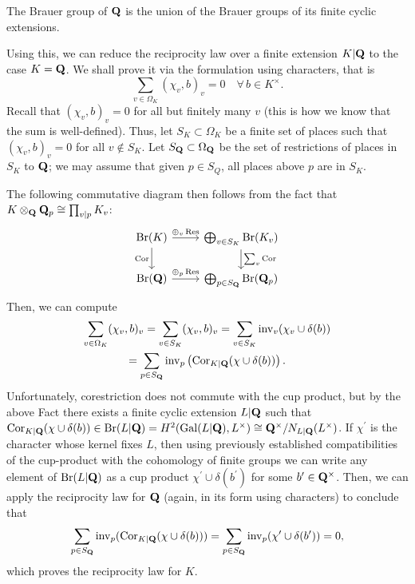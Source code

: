 \documentclass{article}
\begin{document}
\begin{fact}
		The Brauer group of $\mathbf{Q}$ is the union of the Brauer groups of its finite cyclic extensions.
\end{fact}

Using this, we can reduce the reciprocity law over a finite extension $K|\mathbf{Q}$ to the case $K=\mathbf{Q}$. We shall prove it via the formulation using characters, that is
\[
	\sum_{v\in \Omega_K} (\chi_v, b)_v = 0 \quad \forall\, b\in K^\times.
\]
Recall that $(\chi_v, b)_v=0$ for all but finitely many $v$ (this is how we know that the sum is well-defined). Thus, let $S_K\subset \Omega_K$ be a finite set of places such that $(\chi_v, b)_v=0$ for all $v\notin S_K$. Let $S_{\mathbf{Q}}\subset \Omega_{\mathbf{Q}}$ be the set of restrictions of places in $S_K$ to $\mathbf{Q}$; we may assume that given $p\in S_Q$, all places above $p$ are in $S_K$.


The following commutative diagram then follows from the fact that $K\otimes_{\mathbf{Q}} \mathbf{Q}_p \cong \prod_{v|p} K_v$:
\[
	\begin{tikzcd}
			\Br(K) \arrow[r, "\oplus_{v} \operatorname{Res}"] \arrow[d, "\operatorname{Cor}"'] & \bigoplus_{v\in S_K} \Br(K_v) \arrow[d, "\sum_{v} \operatorname{Cor}"] \\
			\Br(\Q) \arrow[r, "\oplus_{p} \operatorname{Res}"] & \bigoplus_{p\in S_\Q} \Br(\Q_p)
	\end{tikzcd}
\]
Then, we can compute
\begin{gather}
		\sum_{v\in \Omega_K} (\chi_v, b)_v = \sum_{v\in S_K} (\chi_v, b)_v=\sum_{v\in S_K} \operatorname{inv}_v(\chi_v\cup \delta(b)) \\
		= \sum_{p\in S_{\mathbf{Q}}} \operatorname{inv}_p\left(\operatorname{Cor}_{K|\mathbf{Q}}(\chi\cup \delta(b))\right).
\end{gather}
Unfortunately, corestriction does not commute with the cup product, but by the above Fact there exists a finite cyclic extension $L|\mathbf{Q}$ such that $\operatorname{Cor}_{K|\mathbf{Q}}(\chi\cup \delta(b))\in \text{Br}(L|\mathbf{Q})=H^2(\operatorname{Gal}(L|\mathbf{Q}),L^\times)\cong \mathbf{Q}^\times / N_{L|\mathbf{Q}}(L^\times)$. If $\chi^\prime$ is the character whose kernel fixes $L$, then using previously established compatibilities of the cup-product with the cohomology of finite groups we can write any element of $\text{Br}(L|\mathbf{Q})$ as a cup product $\chi^\prime\cup \delta(b^\prime)$ for some $b^\prime\in \mathbf{Q}^\times$. Then, we can apply the reciprocity law for $\mathbf{Q}$ (again, in its form using characters) to conclude that
\[
		\sum_{p\in S_{\mathbf{Q}}} \operatorname{inv}_p(\operatorname{Cor}_{K|\mathbf{Q}}(\chi\cup \delta(b))) = \sum_{p\in S_{\mathbf{Q}}} \operatorname{inv}_p(\chi^\prime\cup \delta(b^\prime)) = 0,
\]
which proves the reciprocity law for $K$.
\end{document}

